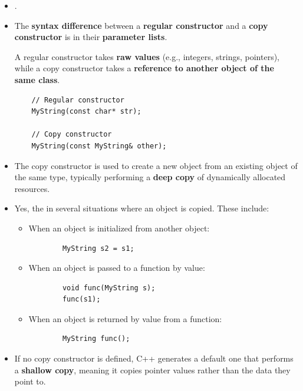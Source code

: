 \documentclass[10pt]{article}
\newcommand{\pbreak}{\vspace{30pt}}
\begin{document}
\begin{itemize}
\item {}.

	\pbreak

\item The \textbf{syntax difference} between a \textbf{regular constructor} and a \textbf{copy constructor} is in their \textbf{parameter lists}.

	A regular constructor takes \textbf{raw values} (e.g., integers, strings, pointers), while a copy constructor takes a \textbf{reference to another object of the same class}.

    \begin{verbatim}
    // Regular constructor
    MyString(const char* str);

    // Copy constructor
    MyString(const MyString& other);
    \end{verbatim}

    \item The copy constructor is used to create a new object from an existing object of the same type, typically performing a \textbf{deep copy} of dynamically allocated resources.

	\item Yes, the \textbf{} in several situations where an object is copied. These include:
    \begin{itemize}
        \item When an object is initialized from another object:
        \begin{verbatim}
        MyString s2 = s1;
        \end{verbatim}

        \item When an object is passed to a function by value:
        \begin{verbatim}
        void func(MyString s);
        func(s1);
        \end{verbatim}

        \item When an object is returned by value from a function:
        \begin{verbatim}
        MyString func();
        \end{verbatim}
    \end{itemize}

    \item If no copy constructor is defined, C++ generates a default one that performs a \textbf{shallow copy}, meaning it copies pointer values rather than the data they point to.


\end{itemize}
\end{document}
